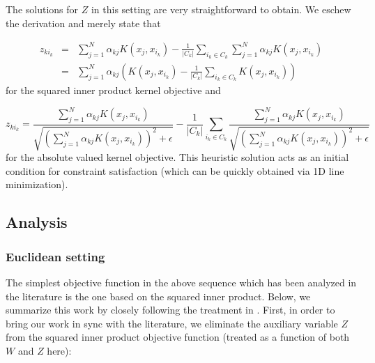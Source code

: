 The solutions for $Z$ in this setting are very straightforward to
obtain. We eschew the derivation and merely state that
\noindent \begin{flushleft}
\begin{equation}
\begin{array}{ccc}
z_{ki_{k}} & = & \sum_{j=1}^{N}\alpha_{kj}K(x_{j},x_{i_{k}})-\frac{1}{|C_{k}|}\sum_{i_{k}\in C_{k}}\sum_{j=1}^{N}\alpha_{kj}K(x_{j},x_{i_{k}})\\
 & = & \sum_{j=1}^{N}\alpha_{kj}\left(K(x_{j},x_{i_{k}})-\frac{1}{|C_{k}|}\sum_{i_{k}\in C_{k}}K(x_{j},x_{i_{k}})\right)
\end{array}\label{eq:zksqrkersol}
\end{equation}
for the squared inner product kernel objective and 
\par\end{flushleft}

\begin{equation}
z_{ki_{k}}=\frac{\sum_{j=1}^{N}\alpha_{kj}K(x_{j},x_{i_{k}})}{\sqrt{\left(\sum_{j=1}^{N}\alpha_{kj}K(x_{j},x_{i_{k}})\right)^{2}+\epsilon}}-\frac{1}{|C_{k}|}\sum_{i_{k}\in C_{k}}\frac{\sum_{j=1}^{N}\alpha_{kj}K(x_{j},x_{i_{k}})}{\sqrt{\left(\sum_{j=1}^{N}\alpha_{kj}K(x_{j},x_{i_{k}})\right)^{2}+\epsilon}}\label{eq:zkabskersol}
\end{equation}
for the absolute valued kernel objective. {\small{}This heuristic
solution acts as an initial condition for constraint satisfaction
(which can be quickly obtained via 1D line minimization).}{\small\par}

\subsection{Analysis}

\subsubsection{Euclidean setting\label{subsec:Euclidean-setting}}

The simplest objective function in the above sequence which has been
analyzed in the literature is the one based on the squared inner product.
Below, we summarize this work by closely following the treatment in
\citep{rapcsak2001minimization,Rapcsak2002}. First, in order to bring
our work in sync with the literature, we eliminate the auxiliary variable
$Z$ from the squared inner product objective function (treated as
a function of both $W$ and $Z$ here): 


